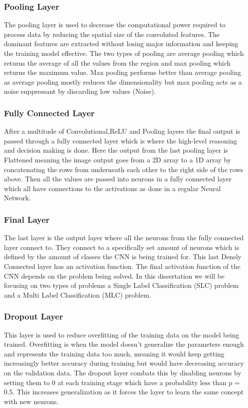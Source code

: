 \documentclass{csfyp}
\begin{document}
\subsubsection{Pooling Layer}
The pooling layer is used to decrease the computational power required to process data by reducing the spatial size of the convoluted features. The dominant features are extracted without losing major information and keeping the training model effective. The two types of pooling are average pooling which returns the average of all the values from the region and max pooling which returns the maximum value. Max pooling performs better than average pooling as average pooling mostly reduces the dimensionality but max pooling acts as a noise suppressant by discarding low values (Noise).

\subsubsection{Fully Connected Layer}
After a multitude of Convolutional,ReLU and Pooling layers the final output is passed through a fully connected layer which is where the high-level reasoning and decision making is done. Here the output from the last pooling layer is Flattened meaning the image output goes from a 2D array to a 1D array by concatenating the rows from underneath each other to the right side of the rows above. Then all the values are passed into neurons in a fully connected layer which all have connections to the activations as done in a regular Neural Network. 

\subsubsection{Final Layer}
The last layer is the output layer where all the neurons from the fully connected layer connect to. They connect to a specifically set amount of neurons which is defined by the amount of classes the CNN is being trained for. This last Densly Connected layer has an activation function. The final activation function of the CNN depends on the problem being solved. In this dissertation we will be focusing on two types of problems a Single Label Classification (SLC) problem and a Multi Label Classification (MLC) problem.

\subsubsection{Dropout Layer}
This layer is used to reduce overfitting of the training data on the model being trained. Overfitting is when the model doesn’t generalize the parameters enough and represents the training data too much, meaning it would keep getting increasingly better accuracy during training but would have decreasing accuracy on the validation data. The dropout layer combats this by disabling neurons by setting them to 0 at each training stage which have a probability less than p = 0.5. This increases generalization as it forces the layer to learn the same concept with new neurons.
\end{document}
